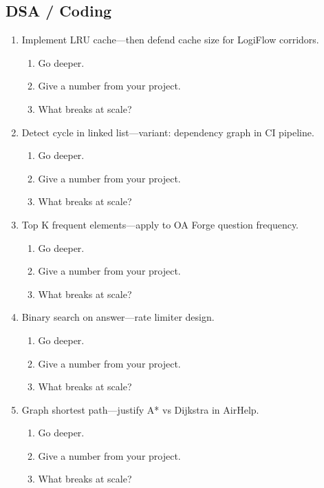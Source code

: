 \documentclass[9pt,a4paper]{article}
\begin{document}
\subsection{DSA / Coding}
\begin{enumerate}[label=\textbf{Q\arabic*:}, leftmargin=*]
  \item Implement LRU cache---then defend cache size for LogiFlow corridors.
  \begin{enumerate}[label=\textit{FU\arabic*:}, leftmargin=2em]
    \item Go deeper.
    \item Give a number from your project.
    \item What breaks at scale?
  \end{enumerate}
  \item Detect cycle in linked list---variant: dependency graph in CI pipeline.
  \begin{enumerate}[label=\textit{FU\arabic*:}, leftmargin=2em]
    \item Go deeper.
    \item Give a number from your project.
    \item What breaks at scale?
  \end{enumerate}
  \item Top K frequent elements---apply to OA Forge question frequency.
  \begin{enumerate}[label=\textit{FU\arabic*:}, leftmargin=2em]
    \item Go deeper.
    \item Give a number from your project.
    \item What breaks at scale?
  \end{enumerate}
  \item Binary search on answer---rate limiter design.
  \begin{enumerate}[label=\textit{FU\arabic*:}, leftmargin=2em]
    \item Go deeper.
    \item Give a number from your project.
    \item What breaks at scale?
  \end{enumerate}
  \item Graph shortest path---justify A* vs Dijkstra in AirHelp.
  \begin{enumerate}[label=\textit{FU\arabic*:}, leftmargin=2em]
    \item Go deeper.
    \item Give a number from your project.
    \item What breaks at scale?
  \end{enumerate}
\end{enumerate}
\newpage
\end{document}
